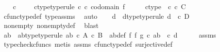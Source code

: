 \begin{isabellebody}
\ \ \isamarkupfalse%
\ c\ \isanewline
\ \ \isamarkupfalse%
\ c{\isacharunderscore}{\kern0pt}type{\isacharbrackleft}{\kern0pt}type{\isacharunderscore}{\kern0pt}rule{\isacharbrackright}{\kern0pt}{\isacharcolon}{\kern0pt}\ {\isachardoublequoteopen}c\ {\isasymin}\isactrlsub c\ codomain\ f{\isachardoublequoteclose}\isanewline
\ \ \isamarkupfalse%
\ \isamarkupfalse%
\ c{\isacharunderscore}{\kern0pt}type{}{\isacharcolon}{\kern0pt}\ \ {\isachardoublequoteopen}c\ {\isasymin}\isactrlsub c\ C{\isachardoublequoteclose}\isanewline
\ \ \ \ \isamarkupfalse%
\ cfunc{\isacharunderscore}{\kern0pt}type{\isacharunderscore}{\kern0pt}def\ type{\isacharunderscore}{\kern0pt}assms{\isacharparenleft}{\kern0pt}{}{\isacharparenright}{\kern0pt}\ \isamarkupfalse%
\ auto\isanewline
\ \ \isamarkupfalse%
\ d\ \ d{\isacharunderscore}{\kern0pt}type{\isacharbrackleft}{\kern0pt}type{\isacharunderscore}{\kern0pt}rule{\isacharbrackright}{\kern0pt}{\isacharcolon}{\kern0pt}\ {\isachardoublequoteopen}d\ \ {\isasymin}\isactrlsub c\ D{\isachardoublequoteclose}\ \isanewline
\ \ \ \ \isamarkupfalse%
\ nonempty\ nonempty{\isacharunderscore}{\kern0pt}def\ \isamarkupfalse%
\ blast\isanewline
\ \ \isamarkupfalse%
\ \isamarkupfalse%
\ ab\ \ ab{\isacharunderscore}{\kern0pt}type{\isacharbrackleft}{\kern0pt}type{\isacharunderscore}{\kern0pt}rule{\isacharbrackright}{\kern0pt}{\isacharcolon}{\kern0pt}\ {\isachardoublequoteopen}ab\ {\isasymin}\isactrlsub c\ A\ {\isasymtimes}\isactrlsub c\ B{\isachardoublequoteclose}\ \ ab{\isacharunderscore}{\kern0pt}def{\isacharcolon}{\kern0pt}\ {\isachardoublequoteopen}{\isacharparenleft}{\kern0pt}f\ {\isasymtimes}\isactrlsub f\ g{\isacharparenright}{\kern0pt}\ {\isasymcirc}\isactrlsub c\ ab\ {\isacharequal}{\kern0pt}\ {\isasymlangle}c{\isacharcomma}{\kern0pt}\ d{\isasymrangle}{\isachardoublequoteclose}\isanewline
\ \ \ \ \isamarkupfalse%
\ assms\ \isamarkupfalse%
\ {\isacharparenleft}{\kern0pt}typecheck{\isacharunderscore}{\kern0pt}cfuncs{\isacharcomma}{\kern0pt}\ metis\ assms{\isacharparenleft}{\kern0pt}{}{\isacharparenright}{\kern0pt}\ cfunc{\isacharunderscore}{\kern0pt}type{\isacharunderscore}{\kern0pt}def\ surjective{\isacharunderscore}{\kern0pt}def{}{\isacharparenright}{\kern0pt}\isanewline
\ \ \isamarkupfalse%
\ \isamarkupfalse%

\end{isabellebody}

